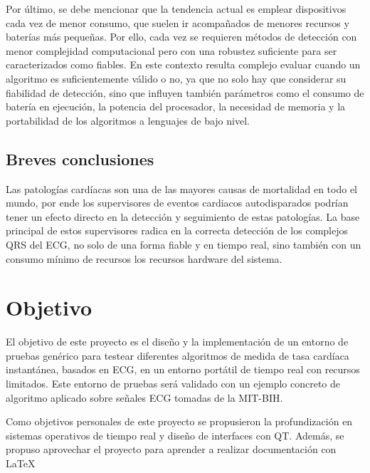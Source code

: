 Por último, se debe mencionar que  la tendencia actual es emplear dispositivos cada vez de menor consumo, que suelen ir acompañados de menores recursos y baterías más pequeñas. Por ello, cada vez se requieren métodos de detección con menor complejidad computacional pero con una robustez suficiente para ser caracterizados como fiables. En este contexto resulta complejo evaluar cuando un algoritmo es suficientemente válido o no, ya que no solo hay que considerar su fiabilidad de detección, sino que influyen también parámetros como el consumo de batería en ejecución, la potencia del procesador, la necesidad de memoria y la portabilidad de los algoritmos a lenguajes de bajo nivel.

\subsection{Breves conclusiones}

Las patologías cardíacas son una de las mayores causas de mortalidad en todo el mundo, por ende los supervisores de eventos cardiacos autodisparados podrían tener un efecto directo en la detección y seguimiento de estas patologías. La base principal de estos supervisores radica en la correcta detección de los complejos QRS del ECG, no solo de una forma fiable y en tiempo real, sino también con un consumo mínimo de recursos los recursos hardware del sistema.

\section{Objetivo}
El objetivo de este proyecto es el diseño y la implementación de un entorno de pruebas genérico para testear diferentes algoritmos de medida de tasa cardíaca instantánea, basados en ECG, en un entorno portátil de tiempo real con recursos limitados. Este entorno de pruebas será validado con un ejemplo concreto de algoritmo aplicado sobre señales ECG tomadas de la MIT-BIH.

Como objetivos personales de este proyecto se propusieron la profundización en sistemas operativos de tiempo real y diseño de interfaces con QT. Además, se propuso aprovechar el  proyecto para aprender a realizar documentación con \LaTeX


